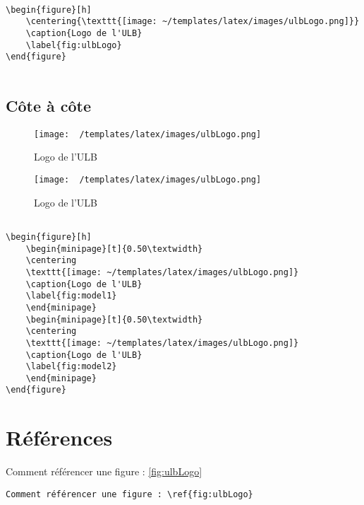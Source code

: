 \documentclass {article}
\begin{document}
\begin{verbatim}

\begin{figure}[h]
	\centering{\texttt{[image: ~/templates/latex/images/ulbLogo.png]}}
	\caption{Logo de l'ULB}
	\label{fig:ulbLogo}
\end{figure}


\end{verbatim}

\newpage
\subsection {Côte à côte}

\begin{figure}[h]
    \begin{minipage}[t]{0.50\textwidth}
	\centering
	\texttt{[image: ~/templates/latex/images/ulbLogo.png]}
	\caption{Logo de l'ULB}
	\label{fig:model1}				
    \end{minipage}			
    \begin{minipage}[t]{0.50\textwidth}				
	\centering
	\texttt{[image: ~/templates/latex/images/ulbLogo.png]}
	\caption{Logo de l'ULB}
	\label{fig:model2}
    \end{minipage}
\end{figure}
\begin{verbatim}

\begin{figure}[h]
    \begin{minipage}[t]{0.50\textwidth}
	\centering
	\texttt{[image: ~/templates/latex/images/ulbLogo.png]}
	\caption{Logo de l'ULB}
	\label{fig:model1}				
    \end{minipage}			
    \begin{minipage}[t]{0.50\textwidth}				
	\centering
	\texttt{[image: ~/templates/latex/images/ulbLogo.png]}
	\caption{Logo de l'ULB}
	\label{fig:model2}
    \end{minipage}
\end{figure}

\end{verbatim}


\section {Références}
Comment référencer une figure : \ref{fig:ulbLogo}
\begin{verbatim}
Comment référencer une figure : \ref{fig:ulbLogo}
\end{verbatim}
\end{document}
